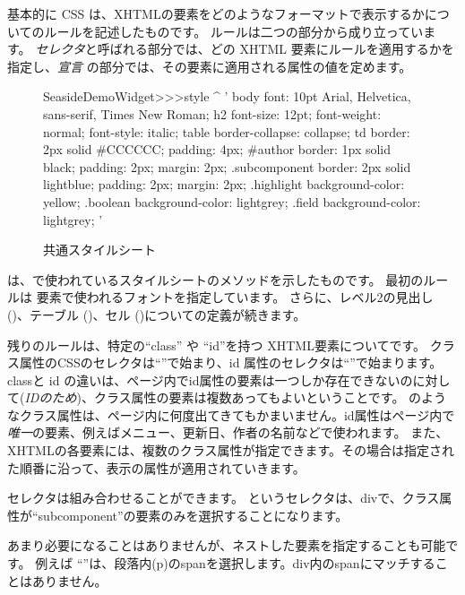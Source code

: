 \documentclass[a4paper,10pt,twoside]{book}
\begin{document}
基本的に CSS は、XHTMLの要素をどのようなフォーマットで表示するかについてのルールを記述したものです。
ルールは二つの部分から成り立っています。
\emph{セレクタ}と呼ばれる部分では、どの XHTML 要素にルールを適用するかを指定し、\emph{宣言} の部分では、その要素に適用される属性の値を定めます。

\begin{figure}[tb]
\begin{code}{}
SeasideDemoWidget>>>style
	^ '
body {
	font: 10pt Arial, Helvetica, sans-serif, Times New Roman;
}
h2 {
	font-size: 12pt;
	font-weight: normal;
	font-style: italic;
}
table { border-collapse: collapse; }
td {
	border: 2px solid #CCCCCC;
	padding: 4px;
}
#author {
	border: 1px solid black;
	padding: 2px;
	margin: 2px;
}
.subcomponent {
	border: 2px solid lightblue;
	padding: 2px;
	margin: 2px;
}
.highlight { background-color: yellow; }
.boolean { background-color: lightgrey; }
.field { background-color: lightgrey; }
'
\end{code}
\caption{ 共通スタイルシート
}
\end{figure}
 は、で使われているスタイルシートのメソッドを示したものです。
最初のルールは 要素で使われるフォントを指定しています。
さらに、レベル2の見出し ()、テーブル ()、セル ()についての定義が続きます。

残りのルールは、特定の``class'' や ``id''を持つ XHTML要素についてです。
クラス属性のCSSのセレクタは``''で始まり、id 属性のセレクタは``\ct{#}''で始まります。
classと id の違いは、ページ内でid属性の要素は一つしか存在できないのに対して(\emph{IDのため})、クラス属性の要素は複数あってもよいということです。
のようなクラス属性は、ページ内に何度出てきてもかまいません。id属性はページ内で \emph{唯一}の要素、例えばメニュー、更新日、作者の名前などで使われます。
また、XHTMLの各要素には、複数のクラス属性が指定できます。その場合は指定された順番に沿って、表示の属性が適用されていきます。


セレクタは組み合わせることができます。  というセレクタは、divで、クラス属性が``subcomponent''の要素のみを選択することになります。

あまり必要になることはありませんが、ネストした要素を指定することも可能です。
例えば ``''は、段落内(p)のspanを選択します。div内のspanにマッチすることはありません。
\end{document}
